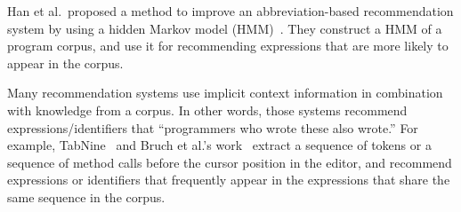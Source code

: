 \documentclass[PRO,english]{ipsj}
\begin{document}

Han et al.\ proposed a method to improve an abbreviation-based recommendation system by using a hidden Markov model (HMM)~\cite{Sangmok}.  They construct a HMM of a program corpus, and use it for recommending expressions that are more likely to appear in the corpus.






Many recommendation systems use implicit context information in combination with knowledge from a corpus.  In other words, those systems recommend expressions/identifiers that ``programmers who wrote these also wrote.'' 
For example, TabNine~\cite{TabNine} and Bruch et al.'s work~\cite{Marcel} extract a sequence of tokens or a sequence of method calls before the cursor position in the editor, and recommend expressions or identifiers that frequently appear in the expressions that share the same sequence in the corpus.  %




\end{document}
